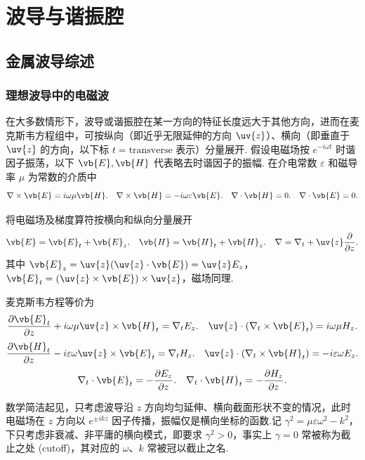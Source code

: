 \section{波导与谐振腔}
\subsection{金属波导综述}
\subsubsection{理想波导中的电磁波}
在大多数情形下，波导或谐振腔在某一方向的特征长度远大于其他方向，进而在麦克斯韦方程组中，可按纵向（即近乎无限延伸的方向 \(\uv{z}\)）、横向（即垂直于 \(\uv{z}\) 的方向，以下标 \(t = \text{transverse}\) 表示）分量展开.
假设电磁场按 \(e^{-i\omega t}\) 时谐因子振荡，以下 \(\vb{E}, \vb{H}\) 代表略去时谐因子的振幅.
在介电常数 \(\varepsilon\) 和磁导率 \(\mu\) 为常数的介质中
\begin{equation*}
	\nabla \times \vb{E} = i\omega\mu \vb{H}. \quad \nabla \times \vb{H} = -i\omega\varepsilon \vb{E}. \quad \nabla \cdot \vb{H} = 0. \quad \nabla \cdot \vb{E} = 0.
\end{equation*}

将电磁场及梯度算符按横向和纵向分量展开
\begin{equation*}
	\vb{E} = \vb{E}_t + \vb{E}_z. \quad \vb{H} = \vb{H}_t + \vb{H}_z. \quad \nabla = \nabla_t + \uv{z} \dfrac{\partial}{\partial z}.
\end{equation*}
其中 \(\vb{E}_z = \uv{z} (\uv{z} \cdot \vb{E}) = \uv{z} E_z\)，\(\vb{E}_t = (\uv{z} \times \vb{E}) \times \uv{z}\)，磁场同理.

麦克斯韦方程等价为
\begin{equation*}
	\dfrac{\partial \vb{E}_t}{\partial z} + i\omega\mu \uv{z} \times \vb{H}_t = \nabla_t E_z. \quad \uv{z} \cdot (\nabla_t \times \vb{E}_t) = i\omega\mu H_z.
\end{equation*}
\begin{equation*}
	\dfrac{\partial \vb{H}_t}{\partial z} - i\varepsilon\omega \uv{z} \times \vb{E}_t = \nabla_t H_z. \quad \uv{z} \cdot (\nabla_t \times \vb{H}_t) = -i\varepsilon\omega E_z.
\end{equation*}
\begin{equation*}
	\nabla_t \cdot \vb{E}_t = -\dfrac{\partial E_z}{\partial z}. \quad \nabla_t \cdot \vb{H}_t = -\dfrac{\partial H_z}{\partial z}.
\end{equation*}

数学简洁起见，只考虑波导沿 \(z\) 方向均匀延伸、横向截面形状不变的情况，此时电磁场在 \(z\) 方向以 \(e^{\pm ikz}\) 因子传播，振幅仅是横向坐标的函数.记 \(\gamma^2 = \mu\varepsilon\omega^2 - k^2\)，下只考虑非衰减、非平庸的横向模式，即要求 \(\gamma^2 > 0\)，事实上 \(\gamma = 0\) 常被称为截止之处 (cutoff)，其对应的 \(\omega\)、\(k\) 常被冠以截止之名.

